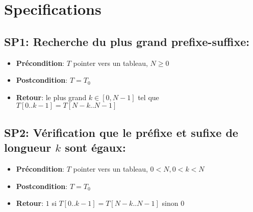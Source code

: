 \section{Specifications}\label{specifications}



\subsection{SP1: Recherche du plus grand prefixe-suffixe:}
\begin{itemize}
    \item \textbf{Précondition}: $T$ pointer vers un tableau, $N \geq 0$
    \item \textbf{Postcondition}: $T = T_0$
    \item \textbf{Retour}: le plus grand $k \in [0, N-1]$ tel que $T[0..k-1] = T[N-k..N-1]$
\end{itemize}



\subsection{SP2: Vérification que le préfixe et sufixe de longueur $k$ sont égaux:}
\begin{itemize}
    \item \textbf{Précondition}: $T$ pointer vers un tableau, $0 < N, 0 < k < N$
    \item \textbf{Postcondition}: $T = T_0$
    \item \textbf{Retour}: $1$ si $T[0..k-1] = T[N-k..N-1]$ sinon $0$
\end{itemize}
